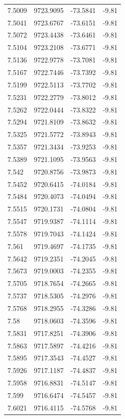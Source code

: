 \begin{table}[H]
\begin{tabular}{llll}
7.5009 & 9723.9095 & -73.5841 & -9.81 \\
7.5041 & 9723.6767 & -73.6151 & -9.81 \\
7.5072 & 9723.4438 & -73.6461 & -9.81 \\
7.5104 & 9723.2108 & -73.6771 & -9.81 \\
7.5136 & 9722.9778 & -73.7081 & -9.81 \\
7.5167 & 9722.7446 & -73.7392 & -9.81 \\
7.5199 & 9722.5113 & -73.7702 & -9.81 \\
7.5231 & 9722.2779 & -73.8012 & -9.81 \\
7.5262 & 9722.0444 & -73.8322 & -9.81 \\
7.5294 & 9721.8109 & -73.8632 & -9.81 \\
7.5325 & 9721.5772 & -73.8943 & -9.81 \\
7.5357 & 9721.3434 & -73.9253 & -9.81 \\
7.5389 & 9721.1095 & -73.9563 & -9.81 \\
7.542 & 9720.8756 & -73.9873 & -9.81 \\
7.5452 & 9720.6415 & -74.0184 & -9.81 \\
7.5484 & 9720.4073 & -74.0494 & -9.81 \\
7.5515 & 9720.1731 & -74.0804 & -9.81 \\
7.5547 & 9719.9387 & -74.1114 & -9.81 \\
7.5578 & 9719.7043 & -74.1424 & -9.81 \\
7.561 & 9719.4697 & -74.1735 & -9.81 \\
7.5642 & 9719.2351 & -74.2045 & -9.81 \\
7.5673 & 9719.0003 & -74.2355 & -9.81 \\
7.5705 & 9718.7654 & -74.2665 & -9.81 \\
7.5737 & 9718.5305 & -74.2976 & -9.81 \\
7.5768 & 9718.2955 & -74.3286 & -9.81 \\
7.58 & 9718.0603 & -74.3596 & -9.81 \\
7.5831 & 9717.8251 & -74.3906 & -9.81 \\
7.5863 & 9717.5897 & -74.4216 & -9.81 \\
7.5895 & 9717.3543 & -74.4527 & -9.81 \\
7.5926 & 9717.1187 & -74.4837 & -9.81 \\
7.5958 & 9716.8831 & -74.5147 & -9.81 \\
7.599 & 9716.6474 & -74.5457 & -9.81 \\
7.6021 & 9716.4115 & -74.5768 & -9.81 \\

\end{tabular}
\end{table}
